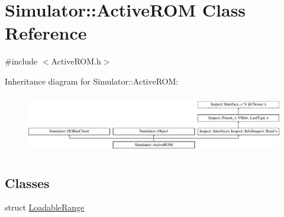 \hypertarget{class_simulator_1_1_active_r_o_m}{\section{Simulator\+:\+:Active\+R\+O\+M Class Reference}
\label{class_simulator_1_1_active_r_o_m}
}


{\ttfamily \#include $<$Active\+R\+O\+M.\+h$>$}

Inheritance diagram for Simulator\+:\+:Active\+R\+O\+M\+:\begin{figure}[H]
\begin{center}
\leavevmode
\includegraphics[height=2.619883cm]{class_simulator_1_1_active_r_o_m}
\end{center}
\end{figure}
\subsection*{Classes}
\begin{DoxyCompactItemize}
\item 
struct \hyperlink{struct_simulator_1_1_active_r_o_m_1_1_loadable_range}{Loadable\+Range}
\end{DoxyCompactItemize}

